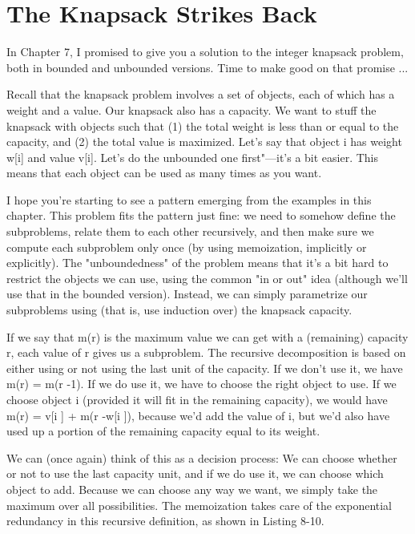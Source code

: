 \section{The Knapsack Strikes Back}
In Chapter 7, I promised to give you a solution to the integer knapsack problem, both in bounded and unbounded versions. Time to make good on that promise ...

Recall that the knapsack problem involves a set of objects, each of which has a weight and a value. Our knapsack also has a capacity. We want to stuff the knapsack with objects such that (1) the total weight is less than or equal to the capacity, and (2) the total value is maximized. Let's say that object i has weight w[i] and value v[i]. Let's do the unbounded one first"---it's a bit easier. This means that each object can be used as many times as you want.

I hope you're starting to see a pattern emerging from the examples in this chapter. This problem
fits the pattern just fine: we need to somehow define the subproblems, relate them to each other
recursively, and then make sure we compute each subproblem only once (by using memoization, implicitly or explicitly). The "unboundedness" of the problem means that it's a bit hard to restrict the objects we can use, using the common "in or out" idea (although we'll use that in the bounded version). Instead, we can simply parametrize our subproblems using (that is, use induction over) the knapsack capacity.

If we say that m(r) is the maximum value we can get with a (remaining) capacity r, each value of r
gives us a subproblem. The recursive decomposition is based on either using or not using the last unit of the capacity. If we don't use it, we have m(r) = m(r -1). If we do use it, we have to choose the right object to use. If we choose object i (provided it will fit in the remaining capacity), we would have m(r) = v[i ] + m(r -w[i ]), because we'd add the value of i, but we'd also have used up a portion of the remaining capacity equal to its weight.

We can (once again) think of this as a decision process: We can choose whether or not to use the last capacity unit, and if we do use it, we can choose which object to add. Because we can choose any way we want, we simply take the maximum over all possibilities. The memoization takes care of the exponential redundancy in this recursive definition, as shown in Listing 8-10.

